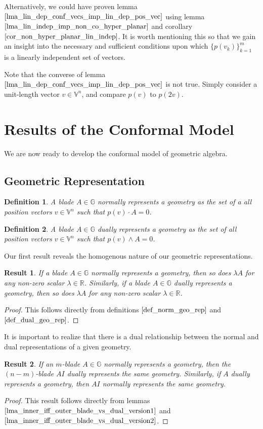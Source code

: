 \documentclass{article}
\newcommand{\R}{\mathbb{R}}
\newcommand{\V}{\mathbb{V}}
\newcommand{\G}{\mathbb{G}}
\newtheorem{definition}{Definition}[section]
\newtheorem{result}{Result}[section]
\begin{document}
Alternatively, we could have proven lemma $\eqref{lma_lin_dep_conf_vecs_imp_lin_dep_pos_vec}$
using lemma $\eqref{lma_lin_indep_imp_non_co_hyper_planar}$
and corollary $\eqref{cor_non_hyper_planar_lin_indep}$.  It is worth mentioning this so that
we gain an insight into the necessary and sufficient conditions upon which $\{p(v_k)\}_{k=1}^m$
is a linearly independent set of vectors.

Note that the converse of lemma $\eqref{lma_lin_dep_conf_vecs_imp_lin_dep_pos_vec}$ is
not true.  Simply consider a unit-length vector $v\in\V^n$, and compare $p(v)$ to $p(2v)$.

\section{Results of the Conformal Model}\label{sec_app_of_thms}

We are now ready to develop the conformal model of geometric algebra.

\subsection{Geometric Representation}

\begin{definition}\label{def_norm_geo_rep}
A blade $A\in\G$ normally represents a geometry as the set of a
all position vectors $v\in\V^n$ such that $p(v)\cdot A=0$.
\end{definition}

\begin{definition}\label{def_dual_geo_rep}
A blade $A\in\G$ dually represents a geometry as the set of all
position vectors $v\in\V^n$ such that $p(v)\wedge A=0$.
\end{definition}

Our first result reveals the homogenous nature of our geometric representations.
\begin{result}\label{rslt_homog_rep}
If a blade $A\in\G$ normally represents a geometry, then so
does $\lambda A$ for any non-zero scalar $\lambda\in\R$.  Similarly,
if a blade $A\in\G$ dually represents a geometry, then so
does $\lambda A$ for any non-zero scalar $\lambda\in\R$.
\end{result}
\begin{proof}
This follows directly from definitions $\eqref{def_norm_geo_rep}$ and $\eqref{def_dual_geo_rep}$.
\end{proof}

It is important to realize that there is a dual relationship between the normal
and dual representations of a given geometry.
\begin{result}\label{rslt_dual_relationship}
If an $m$-blade $A\in\G$ normally represents a geometry, then the
$(n-m)$-blade $AI$ dually represents the same geometry.  Similarly,
if $A$ dually represents a geometry, then $AI$ normally represents
the same geometry.
\end{result}
\begin{proof}
This result follows directly from lemmas $\eqref{lma_inner_iff_outer_blade_vs_dual_version1}$
and $\eqref{lma_inner_iff_outer_blade_vs_dual_version2}$.
\end{proof}
\end{document}
